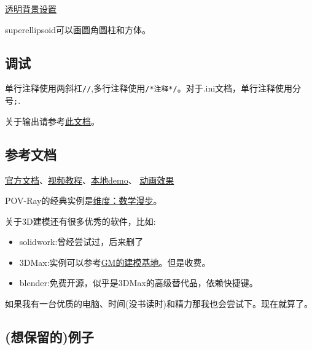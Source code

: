 \documentclass[11pt]{amsart}
\begin{document}
\href{http://www.imagico.de/pov/icons.php}{透明背景设置}

superellipsoid可以画圆角圆柱和方体。
\subsection{调试}
单行注释使用两斜杠\lstinline|//|,多行注释使用\lstinline|/*注释*/|。对于.ini文档，单行注释使用分号\lstinline|;|.

关于输出请参考\href{http://www.f-lohmueller.de/pov_tut/pov_inc/pov_300e.htm}{此文档}。
\subsection{参考文档}
\href{http://www.povray.org/documentation/3.7.0/t2_0.html}{官方文档}、\href{https://www.bilibili.com/video/BV1S4411e7AD}{视频教程}、\href{F://hide/POV/scenes/index.htm}{本地demo}、
\href{http://www.f-lohmueller.de/pov_tut/animate/anim001e.htm}{动画效果}

POV-Ray的经典实例是\href{http://www.dimensions-math.org/Dim_ZH_si.htm}{维度：数学漫步}。

关于3D建模还有很多优秀的软件，比如:
\begin{itemize}
\item solidwork:曾经尝试过，后来删了
\item 3DMax:实例可以参考\href{https://www.bilibili.com/video/BV1hy4y1k7k4}{GM的建模基地}。但是收费。
\item blender:免费开源，似乎是3DMax的高级替代品，依赖快捷键。
\end{itemize}
如果我有一台优质的电脑、时间(没书读时)和精力那我也会尝试下。现在就算了。
\subsection{(想保留的)例子}
\end{document}
